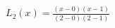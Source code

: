 \documentclass[preview]{standalone}
\begin{document}
\begin{align*}
L_2(x) = \frac{(x - 0)(x - 1)}{(2 - 0)(2 - 1)}
\end{align*}
\end{document}
